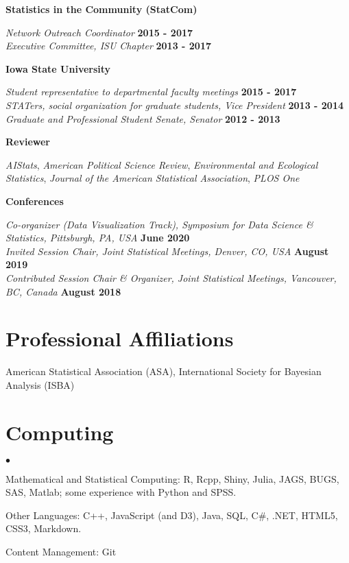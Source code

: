 \documentclass[margin,line]{res}
\newenvironment{list2}{
  \begin{list}{$\bullet$}{%
      \setlength{\itemsep}{0in}
      \setlength{\parsep}{0in} \setlength{\parskip}{0in}
      \setlength{\topsep}{0in} \setlength{\partopsep}{0in}
      \setlength{\leftmargin}{0.2in}}}{\end{list}}
\begin{document}
\begin{resume}
{\bf Statistics in the Community (StatCom)}

\vspace{-.3cm}
{\em Network Outreach Coordinator} \hfill {\bf 2015 - 2017}\\
{\em Executive Committee, ISU Chapter} \hfill {\bf 2013 - 2017}

{\bf Iowa State University}

\vspace{-.3cm}
{\em Student representative to departmental faculty meetings} \hfill {\bf 2015 - 2017}\\
{\em STATers, social organization for graduate students, Vice President} \hfill {\bf 2013 - 2014}\\
{\em Graduate and Professional Student Senate, Senator} \hfill {\bf 2012 - 2013}


{\bf Reviewer}

\vspace{-.3cm}
{\em AIStats}, {\em American Political Science Review}, {\em Environmental and Ecological Statistics}, {\em Journal of the American Statistical Association}, {\em PLOS One}


{\bf Conferences}

\vspace{-.3cm}
{\em Co-organizer (Data Visualization Track), Symposium for Data Science \& Statistics, Pittsburgh, PA, USA} \hfill {\bf June 2020} \\
{\em Invited Session Chair, Joint Statistical Meetings, Denver, CO, USA} \hfill {\bf August 2019} \\
{\em Contributed Session Chair \& Organizer, Joint Statistical Meetings, Vancouver, BC, Canada} \hfill {\bf August 2018}

\section{\sc Professional Affiliations}
American Statistical Association (ASA), International Society for Bayesian Analysis (ISBA)

\section{\sc Computing}
\begin{list2}
\item Mathematical and Statistical Computing:  R, Rcpp, Shiny, Julia, JAGS, BUGS, SAS, Matlab; some experience  with Python and SPSS.
\item Other Languages: C++, JavaScript (and D3), Java, SQL, C\#, .NET, HTML5, CSS3, Markdown.
\item Content Management: Git
\end{list2}


\end{resume}
\end{document}
